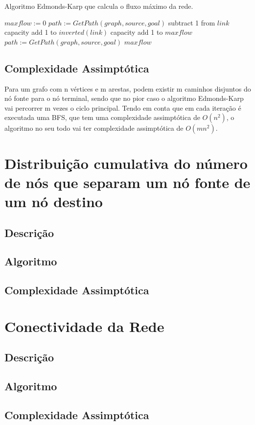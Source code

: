 \documentclass[12pt,a4paper]{scrartcl}
\begin{document}
\begin{algorithm}
\caption{Algoritmo Edmonds-Karp que calcula o fluxo máximo da rede.}\label{alg:residual_network}
\begin{algorithmic}[1]
    \State $maxflow := 0 $
    \State $path := GetPath(graph,source,goal)$
      		\State subtract 1 from $link$ capacity
        	\State add 1 to $inverted(link)$ capacity
      \EndFor
      \State add 1 to $maxflow$
      \State $path := GetPath(graph,source,goal)$
  	\EndWhile
  	\Return $maxflow$
\EndProcedure
\end{algorithmic}
\end{algorithm}

\subsection{Complexidade Assimptótica}

Para um grafo com n vértices e m arestas, podem existir m caminhos disjuntos do nó fonte para o nó terminal, sendo que no pior caso o algoritmo Edmonds-Karp vai percorrer m vezes o ciclo principal.
Tendo em conta que em cada iteração é executada uma BFS, que tem uma complexidade assimptótica de $O(n^2)$, o algoritmo no seu todo vai ter complexidade assimptótica de $O(m n^2)$.


\section{Distribuição cumulativa do número de nós que separam um nó fonte de um nó destino}

\subsection{Descrição}

\subsection{Algoritmo}

\subsection{Complexidade Assimptótica}

\section{Conectividade da Rede}

\subsection{Descrição}

\subsection{Algoritmo}

\subsection{Complexidade Assimptótica}
\end{document}
